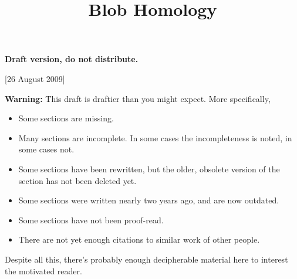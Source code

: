 \documentclass[11pt,leqno]{amsart}
\title{Blob Homology}
\begin{document}
\makeatletter
{}
\gdef\theequation{\thesection.\arabic{equation}}
\makeatother

\maketitle

\textbf{Draft version, do not distribute.}

[26 August 2009]

\medskip

\noindent
{\bf Warning:} This draft is draftier than you might expect.
More specifically,
\begin{itemize}
\item Some sections are missing.
\item Many sections are incomplete.
In some cases the incompleteness is noted, in some cases not.
\item Some sections have been rewritten, but the older, obsolete version of
the section has not been deleted yet.
\item Some sections were written nearly two years ago, and are now outdated.
\item Some sections have not been proof-read.
\item There are not yet enough citations to similar work of other people.
\end{itemize}
Despite all this, there's probably enough decipherable material
here to interest the motivated reader.
\end{document}
